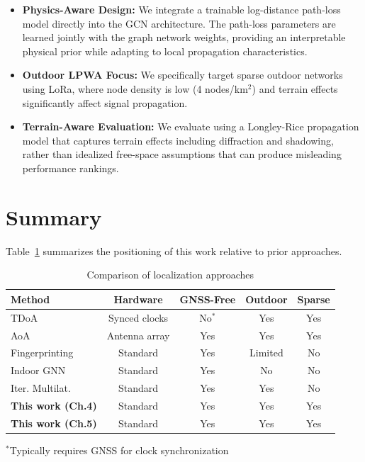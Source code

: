 \documentclass[master,final,11pt]{iscs-thesis}
\begin{document}
\begin{itemize}
    \item \textbf{Physics-Aware Design:} We integrate a trainable log-distance path-loss model directly into the GCN architecture. The path-loss parameters are learned jointly with the graph network weights, providing an interpretable physical prior while adapting to local propagation characteristics.
    
    \item \textbf{Outdoor LPWA Focus:} We specifically target sparse outdoor networks using LoRa, where node density is low (4 nodes/km$^2$) and terrain effects significantly affect signal propagation.
    
    \item \textbf{Terrain-Aware Evaluation:} We evaluate using a Longley-Rice propagation model that captures terrain effects including diffraction and shadowing, rather than idealized free-space assumptions that can produce misleading performance rankings.
\end{itemize}

\section{Summary}
\label{sec:related_work_summary}

Table~\ref{tab:related_work_summary} summarizes the positioning of this work relative to prior approaches.

\begin{table}[htbp]
\centering
\caption{Comparison of localization approaches}
\label{tab:related_work_summary}
\begin{tabular}{@{}lcccc@{}}
\toprule
\textbf{Method} & \textbf{Hardware} & \textbf{GNSS-Free} & \textbf{Outdoor} & \textbf{Sparse} \\
\midrule
TDoA~\cite{fargas2017gps} & Synced clocks & No$^*$ & Yes & Yes \\
AoA~\cite{ref_aoa_lora} & Antenna array & Yes & Yes & Yes \\
Fingerprinting~\cite{purohit2020fingerprinting} & Standard & Yes & Limited & No \\
Indoor GNN~\cite{vishwakarma2023indoorgnn} & Standard & Yes & No & No \\
Iter. Multilat.~\cite{hada2025hybrid} & Standard & Yes & Yes & No \\
\midrule
\textbf{This work (Ch.4)} & Standard & Yes & Yes & Yes \\
\textbf{This work (Ch.5)} & Standard & Yes & Yes & Yes \\
\bottomrule
\end{tabular}
\vspace{2mm}
\raggedright
\footnotesize{$^*$Typically requires GNSS for clock synchronization}
\end{table}
\end{document}
